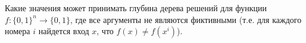 Какие значения может принимать глубина дерева решений для функции $f\colon \{0, 1\}^n \rightarrow \{0,
1\}$, где все аргументы не являются фиктивными (т.е. для каждого номера $i$ найдется вход $x$, что $f(x)
\neq f(x^{i})$).
